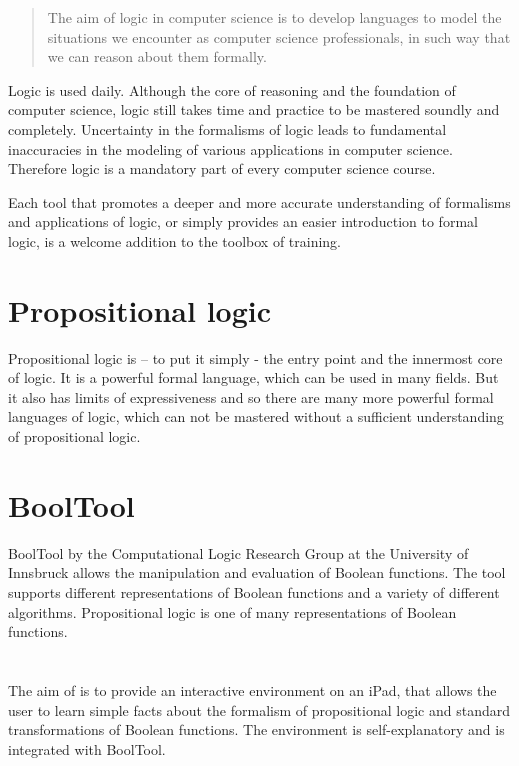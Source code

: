 
\begin{quote}
The aim of logic in computer science is to develop languages 
to model the situations we encounter as computer science professionals, 
in such way that we can reason about them formally. \cite{Huth:2004:LCS:975331}
\end{quote}

Logic is used daily. Although the core of reasoning and the foundation of computer science, 
logic still takes time and practice to be mastered soundly and completely. 
Uncertainty in the formalisms of logic leads to fundamental inaccuracies 
in the modeling of various applications in computer science. 
Therefore logic is a mandatory part of every computer science course. 

Each tool that promotes a deeper and more accurate understanding of formalisms and applications of logic,
or simply provides an easier introduction to formal logic, 
is a welcome addition to the toolbox of training.

\section{Propositional logic}

Propositional logic is – to put it simply - the entry point and the innermost core of logic. 
It is a powerful formal language, which can be used in many fields. 
But it also has limits of expressiveness and so 
there are many more powerful formal languages of logic, 
which can not be mastered without a sufficient understanding  of propositional logic.

\section{BoolTool}

BoolTool by the Computational Logic Research Group at the University of Innsbruck allows the manipulation and evaluation of Boolean functions. The tool supports different representations of Boolean functions and a variety of different algorithms.
Propositional logic is one of many representations of Boolean functions.

\section{\Nyaya}

The aim of \Nyaya is to provide an interactive environment on an iPad,
that allows the user to learn simple facts about the formalism of propositional logic 
and standard transformations of Boolean functions. 
The environment is self-explanatory and is integrated with BoolTool. 


%
